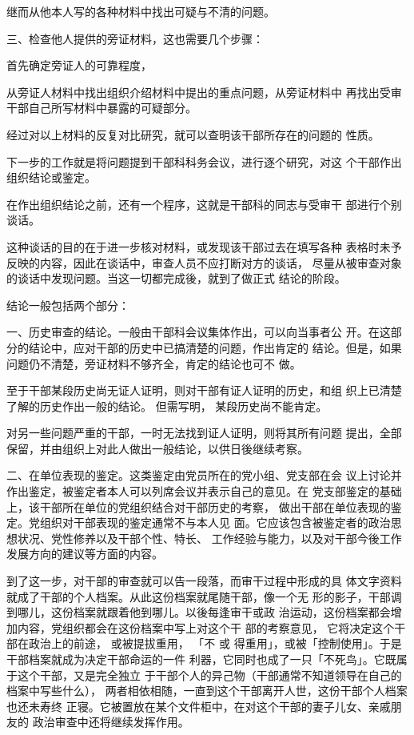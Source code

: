 继而从他本人写的各种材料中找出可疑与不清的问题。

三、检查他人提供的旁证材料，这也需要几个步骤：

首先确定旁证人的可靠程度，

从旁证人材料中找出组织介绍材料中提出的重点问题，从旁证材料中
再找出受审干部自己所写材料中暴露的可疑部分。

经过对以上材料的反复对比研究，就可以查明该干部所存在的问题的
性质。

下一步的工作就是将问题提到干部科科务会议，进行逐个研究，对这
个干部作出组织结论或鉴定。

在作出组织结论之前，还有一个程序，这就是干部科的同志与受审干
部进行个别谈话。

这种谈话的目的在于进一步核对材料，或发现该干部过去在填写各种
表格时未予反映的内容，因此在谈话中，审查人员不应打断对方的谈话，
尽量从被审查对象的谈话中发现问题。当这一切都完成後，就到了做正式
结论的阶段。

结论一般包括两个部分：

一、历史审查的结论。一般由干部科会议集体作出，可以向当事者公
开。在这部分的结论中，应对干部的历史中已搞清楚的问题，作出肯定的
结论。但是，如果问题仍不清楚，旁证材料不够齐全，肯定的结论也可不
做。

至于干部某段历史尚无证人证明，则对干部有证人证明的历史，和组
织上已清楚了解的历史作出一般的结论。
但需写明，
某段历史尚不能肯定。

对另一些问题严重的干部，一时无法找到证人证明，则将其所有问题
提出，全部保留，并由组织上对此人做出一般结论，以供日後继续考察。

二、在单位表现的鉴定。这类鉴定由党员所在的党小组、党支部在会
议上讨论并作出鉴定，被鉴定者本人可以列席会议并表示自己的意见。在
党支部鉴定的基础上，该干部所在单位的党组织结合对干部历史的考察，
做出干部在单位表现的鉴定。党组织对干部表现的鉴定通常不与本人见
面。它应该包含被鉴定者的政治思想状况、党性修养以及干部个性、特长、
工作经验与能力，以及对干部今後工作发展方向的建议等方面的内容。

到了这一步，对干部的审查就可以告一段落，而审干过程中形成的具
体文字资料就成了干部的个人档案。从此这份档案就尾随干部，像一个无
形的影子，干部调到哪儿，这份档案就跟着他到哪儿。以後每逢审干或政
治运动，这份档案都会增加内容，党组织都会在这份档案中写上对这个干
部的考察意见，
它将决定这个干部在政治上的前途，
或被提拔重用， 「不
或
得重用」，或被「控制使用」。于是干部档案就成为决定干部命运的一件
利器，它同时也成了一只「不死鸟」。它既属于这个干部，又是完全独立
于干部个人的异己物（干部通常不知道领导在自己的档案中写些什么），
两者相依相随，一直到这个干部离开人世，这份干部个人档案也还未寿终
正寝。它被置放在某个文件柜中，在对这个干部的妻子儿女、亲戚朋友的
政治审查中还将继续发挥作用。


